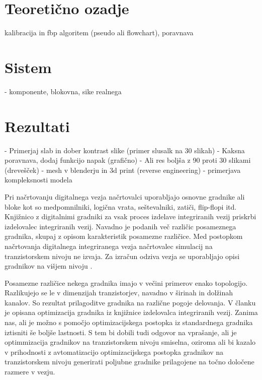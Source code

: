 \documentclass[journal,a4paper,twoside]{sty/IEEEtran}
\begin{document}
\section{Teoretično ozadje}
kalibracija in fbp algoritem (pseudo ali flowchart), poravnava

\section{Sistem}
- komponente, blokovna, sike realnega

\section{Rezultati}
-	Primerjaj slab in dober kontrast slike (primer slusalk na 30 slikah)
-	Kaksna poravnava, dodaj funkcijo napak (grafično)
-	Ali res boljša z 90 proti 30 slikami (drevešček)
-  mesh v blenderju in 3d print (reverse engineering)
-  primerjava kompleksnosti modela


Pri načrtovanju digitalnega vezja načrtovalci uporabljajo osnovne gradnike ali bloke \cite{kaeslin} kot so medpomnilniki, logična vrata, seštevalniki, zatiči, flip-flopi itd. Knjižnico z digitalnimi gradniki za vsak proces izdelave integriranih vezij priskrbi izdelovalec integriranih vezij. Navadno je podanih več različic posameznega gradnika, skupaj z opisom karakteristik posamezne različice. Med postopkom načrtovanja digitalnega integriranega vezja načrtovalec simulacij \cite{hspice, kunderth, virtuoso, tuma} na tranzistorskem nivoju ne izvaja. Za izračun odziva vezja se uporabljajo opisi gradnikov na višjem nivoju \cite{thomas, pedroni}.

Posamezne različice nekega gradnika imajo v večini primerov enako topologijo. Razlikujejo se le v dimenzijah tranzistorjev, navadno v širinah in dolžinah kanalov. So rezultat prilagoditve gradnika na različne pogoje delovanja. V članku je opisana optimizacija gradnika iz knjižnice izdelovalca integriranih vezij. Zanima nas, ali je možno s pomočjo optimizacijskega postopka iz standardnega gradnika iztisniti še boljše lastnosti. S tem bi dobili tudi odgovor na vprašanje, ali je optimmizacija gradnikov na tranzistorskem nivoju smiselna, oziroma ali bi kazalo v prihodnosti z avtomatizacijo optimizacijskega postopka gradnikov na tranzistorskem nivoju generirati poljubne gradnike prilagojene na točno določene razmere v vezju.
\end{document}
